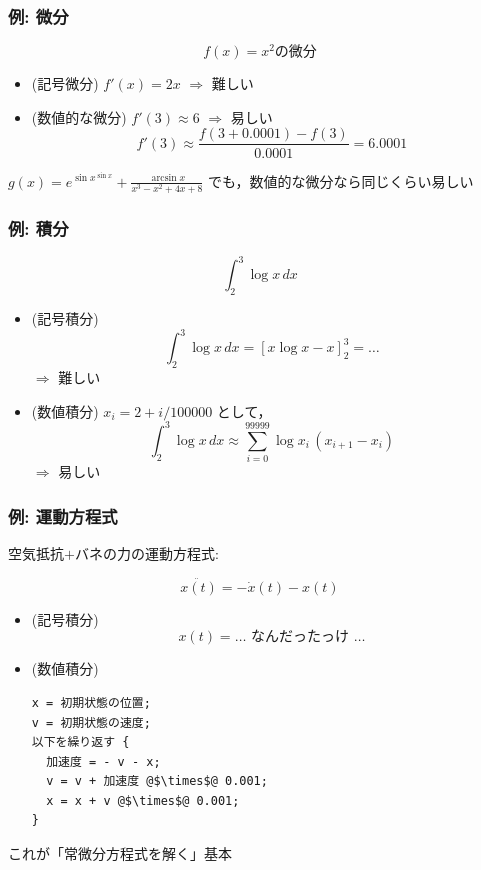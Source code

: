 \documentclass[12pt,dvipdfmx]{beamer}
\begin{document}
\begin{frame}
\frametitle{例: 微分}
\[ f(x) = x^2 \mbox{の微分} \]
\begin{itemize}
\item (記号微分) $f'(x) = 2x$ $\Rightarrow$ 難しい
\item (数値的な微分) $f'(3) \approx 6$ $\Rightarrow$ 易しい
\[ f'(3) \approx \frac{f(3+0.0001) - f(3)}{0.0001} = 6.0001 \]
\end{itemize}

$g(x) = e^{\sin x^{\sin x}} + \frac{\arcsin x}{x^3 - x^2 + 4x + 8}$
でも，数値的な微分なら同じくらい易しい
\end{frame}

\begin{frame}
\frametitle{例: 積分}
\[ \int_2^3 \log x \, dx \]

\begin{itemize}
\item (記号積分) 
\[ \int_2^3 \log x \, dx = \left[ x \log x - x \right]_2^3 = \ldots \]
$\Rightarrow$ 難しい

\item (数値積分) $x_i = 2 + i/100000$ として，
\[ \int_2^3 \log x \, dx \approx  \sum_{i=0}^{99999} \log x_i \, (x_{i+1}-x_i) \]
$\Rightarrow$ 易しい
\end{itemize}
\end{frame}


\begin{frame}[fragile]
\frametitle{例: 運動方程式}
空気抵抗$+$バネの力の運動方程式:

\[ \ddot{x(t)} = - \dot{x}(t) - x(t) \]

\begin{itemize}
\item (記号積分) 
\[ x(t) = \ldots \mbox{ なんだったっけ \ldots } \]

\item (数値積分) 

\begin{lstlisting}
x = 初期状態の位置;
v = 初期状態の速度;
以下を繰り返す {
  加速度 = - v - x;
  v = v + 加速度 @$\times$@ 0.001;
  x = x + v @$\times$@ 0.001;
}
\end{lstlisting}
\end{itemize}

これが「常微分方程式を解く」基本

\end{frame}
\end{document}
